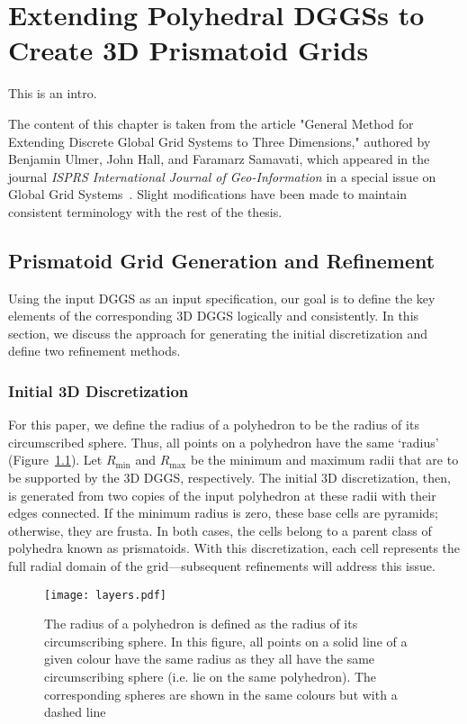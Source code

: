 \chapter{Extending Polyhedral DGGSs to Create 3D Prismatoid Grids} \label{chap:extension}
This is an intro.

The content of this chapter is taken from the article "General Method for Extending Discrete Global Grid Systems to Three Dimensions," authored by Benjamin Ulmer, John Hall, and Faramarz Samavati, which appeared in the journal \textit{ISPRS International Journal of Geo-Information} in a special issue on Global Grid Systems~\cite{ulmer2020general}.
Slight modifications have been made to maintain consistent terminology with the rest of the thesis.


\section{Prismatoid Grid Generation and Refinement} \label{chap:5:grid}
Using the input DGGS as an input specification, our goal is to define the key elements of the corresponding 3D DGGS logically and consistently.
In this section, we discuss the approach for generating the initial discretization and define two refinement methods.


\subsection{Initial 3D Discretization} \label{chap:5:discretization}
For this paper, we define the radius of a polyhedron to be the radius of its circumscribed sphere. Thus, all points on a polyhedron have the same `radius' (Figure~\ref{fig:layers}).
Let $R_\mathrm{min}$ and $R_\mathrm{max}$ be the minimum and maximum radii that are to be supported by the 3D DGGS, respectively.
The initial 3D discretization, then, is generated from two copies of the input polyhedron at these radii with their edges connected.
If the minimum radius is zero, these base cells are pyramids; otherwise, they are frusta.
In both cases, the cells belong to a parent class of polyhedra known as prismatoids.
With this discretization, each cell represents the full radial domain of the grid---subsequent refinements will address this issue.


\begin{figure}[ht!]
	\centering
	\texttt{[image: layers.pdf]}
	\caption[How the radius of a polyhedron is defined]{
		The radius of a polyhedron is defined as the radius of its circumscribing sphere.
		In this figure, all points on a solid line of a given colour have the same radius as they all have the same circumscribing sphere (i.e. lie on the same polyhedron).
		The corresponding spheres are shown in the same colours but with a dashed line
	}
	\label{fig:layers}
\end{figure}


